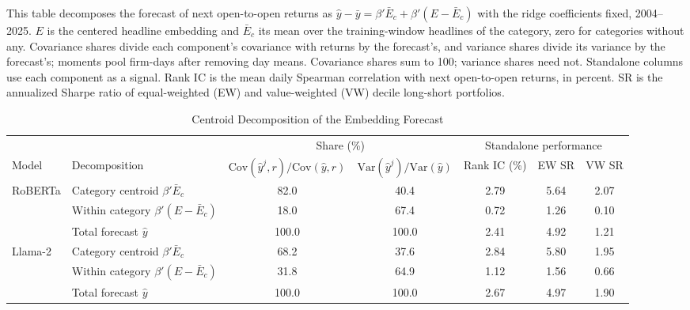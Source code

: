 \begin{table}[htbp]
\centering
\caption{Centroid Decomposition of the Embedding Forecast}
\label{tab:tabA_centroid}
\begin{minipage}{\linewidth}\footnotesize
This table decomposes the forecast of next open-to-open returns as $\hat y-\bar y=\beta'\bar E_c+\beta'(E-\bar E_c)$ with the ridge coefficients fixed, 2004--2025. $E$ is the centered headline embedding and $\bar E_c$ its mean over the training-window headlines of the category, zero for categories without any. Covariance shares divide each component's covariance with returns by the forecast's, and variance shares divide its variance by the forecast's; moments pool firm-days after removing day means. Covariance shares sum to 100; variance shares need not. Standalone columns use each component as a signal. Rank IC is the mean daily Spearman correlation with next open-to-open returns, in percent. SR is the annualized Sharpe ratio of equal-weighted (EW) and value-weighted (VW) decile long-short portfolios.
\end{minipage}
\medskip

{\footnotesize
\begin{adjustbox}{max width=\linewidth, max totalheight=0.75\textheight}
\begin{tabular}{llccccc}
\toprule
\multicolumn{2}{c}{} & \multicolumn{2}{c}{Share (\%)} & \multicolumn{3}{c}{Standalone performance} \\
\cmidrule(lr){3-4} \cmidrule(lr){5-7}
Model & Decomposition & $\mathrm{Cov}(\hat y^j,r)/\mathrm{Cov}(\hat y,r)$ & $\mathrm{Var}(\hat y^j)/\mathrm{Var}(\hat y)$ & Rank IC (\%) & EW SR & VW SR \\
\midrule
RoBERTa & Category centroid $\beta'\bar E_c$ & \phantom{0}82.0 & \phantom{0}40.4 & 2.79 & 5.64 & 2.07 \\
 & Within category $\beta'(E-\bar E_c)$ & \phantom{0}18.0 & \phantom{0}67.4 & 0.72 & 1.26 & 0.10 \\
 & Total forecast $\hat y$ & 100.0 & 100.0 & 2.41 & 4.92 & 1.21 \\
\midrule
Llama-2 & Category centroid $\beta'\bar E_c$ & \phantom{0}68.2 & \phantom{0}37.6 & 2.84 & 5.80 & 1.95 \\
 & Within category $\beta'(E-\bar E_c)$ & \phantom{0}31.8 & \phantom{0}64.9 & 1.12 & 1.56 & 0.66 \\
 & Total forecast $\hat y$ & 100.0 & 100.0 & 2.67 & 4.97 & 1.90 \\
\bottomrule
\end{tabular}
\end{adjustbox}
}
\end{table}
